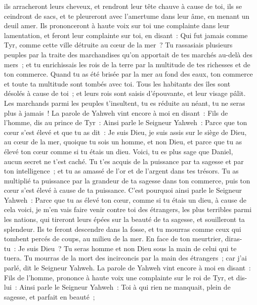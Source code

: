 \begin{multicols}{2}
ils arracheront leurs cheveux, et rendront leur tête chauve à cause de toi, ils se ceindront de sacs, et te pleureront avec l'amertume dans leur âme, en menant un deuil amer.
Ils prononceront à haute voix sur toi une complainte dans leur lamentation, et feront leur complainte sur toi, en disant~: Qui fut jamais comme Tyr, comme cette ville détruite au cœur de la mer~?
Tu rassasiais plusieurs peuples par la traite des marchandises qu'on apportait de tes marchés au-delà des mers~; et tu enrichissais les rois de la terre par la multitude de tes richesses et de ton commerce.
Quand tu as été brisée par la mer au fond des eaux, ton commerce et toute ta multitude sont tombés avec toi.
Tous les habitants des îles sont désolés à cause de toi~; et leurs rois sont saisis d'épouvante, et leur visage pâlit.
Les marchands parmi les peuples t'insultent, tu es réduite au néant, tu ne seras plus à jamais~!
\VerseOne{}La parole de Yahweh vint encore à moi en disant~:
Fils de l'homme, dis au prince de Tyr~: Ainsi parle le Seigneur Yahweh~: Parce que ton cœur s'est élevé et que tu as dit~: Je suis Dieu, je suis assis sur le siège de Dieu, au cœur de la mer, quoique tu sois un homme, et non Dieu, et parce que tu as élevé ton cœur comme si tu étais un dieu.
Voici, tu es plus sage que Daniel, aucun secret ne t'est caché.
Tu t'es acquis de la puissance par ta sagesse et par ton intelligence~; et tu as amassé de l'or et de l'argent dans tes trésors.
Tu as multiplié ta puissance par la grandeur de ta sagesse dans ton commerce, puis ton cœur s'est élevé à cause de ta puissance.
C'est pourquoi ainsi parle le Seigneur Yahweh~: Parce que tu as élevé ton cœur, comme si tu étais un dieu,
à cause de cela voici, je m'en vais faire venir contre toi des étrangers, les plus terribles parmi les nations, qui tireront leurs épées sur la beauté de ta sagesse, et souilleront ta splendeur.
Ils te feront descendre dans la fosse, et tu mourras comme ceux qui tombent percés de coups, au milieu de la mer.
En face de ton meurtrier, diras-tu~: Je suis Dieu~? Tu seras homme et non Dieu sous la main de celui qui te tuera.
Tu mourras de la mort des incirconcis par la main des étrangers~; car j'ai parlé, dit le Seigneur Yahweh.
La parole de Yahweh vint encore à moi en disant~:
Fils de l'homme, prononce à haute voix une complainte sur le roi de Tyr, et dis-lui~: Ainsi parle le Seigneur Yahweh~: Toi à qui rien ne manquait, plein de sagesse, et parfait en beauté~;

\end{multicols}
